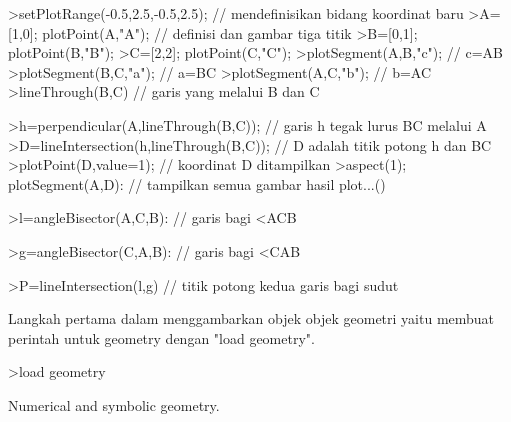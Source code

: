 \documentclass[a4paper,10pt]{article}
\begin{document}
\begin{eulernotebook}
\begin{eulercomment}
\begin{eulercomment}
\begin{eulercomment}
\end{eulercomment}
\begin{eulerprompt}
>setPlotRange(-0.5,2.5,-0.5,2.5); // mendefinisikan bidang koordinat baru
>A=[1,0]; plotPoint(A,"A"); // definisi dan gambar tiga titik
>B=[0,1]; plotPoint(B,"B");
>C=[2,2]; plotPoint(C,"C");
>plotSegment(A,B,"c"); // c=AB
>plotSegment(B,C,"a"); // a=BC
>plotSegment(A,C,"b"); // b=AC
>lineThrough(B,C) // garis yang melalui B dan C
\end{eulerprompt}
\begin{euleroutput}
  [-1,  2,  2]
\end{euleroutput}
\begin{eulerprompt}
>h=perpendicular(A,lineThrough(B,C)); // garis h tegak lurus BC melalui A
>D=lineIntersection(h,lineThrough(B,C)); // D adalah titik potong h dan BC
>plotPoint(D,value=1); // koordinat D ditampilkan
>aspect(1); plotSegment(A,D): // tampilkan semua gambar hasil plot...()
\end{eulerprompt}
\begin{eulerprompt}
>l=angleBisector(A,C,B): // garis bagi <ACB
\end{eulerprompt}
\begin{eulerprompt}
>g=angleBisector(C,A,B): // garis bagi <CAB
\end{eulerprompt}
\begin{eulerprompt}
>P=lineIntersection(l,g) // titik potong kedua garis bagi sudut
\end{eulerprompt}
\begin{euleroutput}
  [0.86038,  0.86038]
\end{euleroutput}
\begin{eulercomment}
Langkah pertama dalam menggambarkan objek objek geometri yaitu membuat
perintah untuk geometry dengan "load geometry".
\end{eulercomment}
\begin{eulerprompt}
>load geometry
\end{eulerprompt}
\begin{euleroutput}
  Numerical and symbolic geometry.
\end{euleroutput}

\end{eulercomment}
\end{eulercomment}
\end{eulernotebook}
\end{document}
